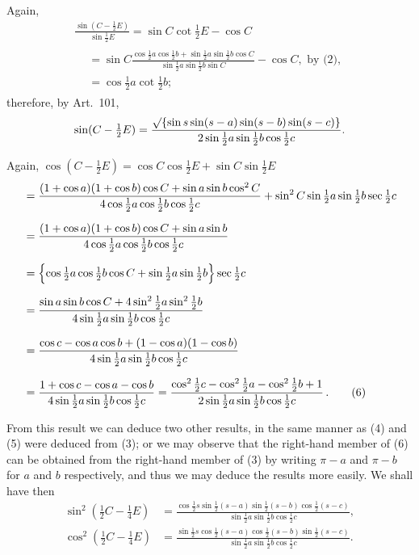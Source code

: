 \documentclass{book}[2004/02/16]
\begin{document}
\begin{mainmatter}
\begin{spacing}{1.3}
Again,
\begin{multline*}
\frac{\sin(C-\tfrac12E)}{\sin\frac12E} = \sin C\cot\tfrac12E-\cos C\\
\begin{aligned}
&= \sin C \frac{\cos\frac12a \cos\frac12b
               + \sin\frac12a \sin\frac12b \cos C}
               {\sin\frac12a \sin\frac12b \sin C}
 - \cos C, \text{ by (2),}
\\
&=\cos\tfrac12a \cot\tfrac12b;
\end{aligned}
\end{multline*}
therefore, by Art.\ 101,
\[
  \sin(C-\tfrac12E)
= \frac{\surd\{\sin s \sin(s-a) \sin(s-b) \sin(s-c) \} }
       {2\sin\frac12a \sin\frac12b \cos\frac12c }.
\]

Again, $\cos(C-\frac12E)=\cos C\cos\frac12E+\sin C\sin\frac12E$
\begin{align*}
&= \frac{(1+\cos a)(1+\cos b)\cos C + \sin a\sin b\cos^2 C }
        {4\cos\frac12a \cos\frac12b \cos\frac12c }
 + \sin^2C \sin\tfrac12a \sin\tfrac12b \sec\tfrac12c
\\[1.5ex]
&= \frac{(1+\cos a)(1+\cos b)\cos C + \sin a\sin b }
        {4\cos\frac12a \cos\frac12b \cos\frac12c }
\\[1.5ex]
&= \Bigl\{\cos\tfrac12a \cos\tfrac12b \cos C
         + \sin\tfrac12a \sin\tfrac12b \Bigr\} \sec\tfrac12c
\\[1.5ex]
&= \frac{\sin a\sin b\cos C + 4\sin^2\frac12a \sin^2\frac12b }
        {4\sin\frac12a \sin\frac12b \cos\frac12c }
\\[1.5ex]
&= \frac{\cos c - \cos a\cos b + (1-\cos a)(1-\cos b) }
        {4\sin\frac12a \sin\frac12b \cos\frac12c }
\\[1.5ex]
&= \frac{1 + \cos c - \cos a - \cos b }
        {4\sin\frac12a \sin\frac12b \cos\frac12c }
 = \frac{\cos^2\frac12c - \cos^2\frac12a - \cos^2\frac12b + 1 }
        {2\sin\frac12a \sin\frac12b \cos\frac12c }\,.\tag{6}
\end{align*}

From this result we can deduce two other results, in the
same manner as (4) and (5) were deduced from (3); or we may
observe that the right-hand member of (6) can be obtained from
the right-hand member of (3) by writing $\pi-a$ and $\pi-b$ for
$a$ and $b$ respectively, and thus we may deduce the results more
easily. We shall have then
\begin{align*}
\sin^2 (\tfrac{1}{2}C-\tfrac{1}{4}E) &=
  \frac{\cos\frac{1}{2}s \sin\frac{1}{2}(s-a) \sin\frac{1}{2}(s-b) \cos\frac{1}{2}(s-c) }
       {\sin\frac{1}{2}a \sin\frac{1}{2}b \cos\frac{1}{2}c },
\\[1.5ex]
\cos^2 (\tfrac{1}{2}C-\tfrac{1}{4}E) &=
  \frac{\sin\frac{1}{2}s \cos\frac{1}{2}(s-a) \cos\frac{1}{2}(s-b) \sin\frac{1}{2}(s-c) }
       {\sin\frac{1}{2}a \sin\frac{1}{2}b \cos\frac{1}{2}c }.
\end{align*}


\end{spacing}
\end{mainmatter}
\end{document}
